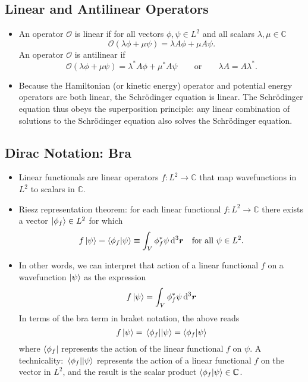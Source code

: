 \documentclass[11pt, a4paper]{article}
\newcommand{\diff}{\mathop{}\!\mathrm{d}} %
\newcommand{\dr}{\diff^{3} \r}  %
\newcommand{\eqtext}[1]{\qquad \text{#1} \qquad}
\newcommand{\Schro}{Schr\"{o}dinger\xspace}
\renewcommand{\vec}[1]{\bm{#1}} %
\renewcommand{\r}{\vec{r}}  %
\renewcommand{\O}{\mathcal{O}}  %
\newcommand{\p}{\psi}  %
\begin{document}
\subsection{Linear and Antilinear Operators}
\begin{itemize}
	\item An operator $ \O $ is linear if for all vectors $ \phi, \psi \in L^{2} $ and all scalars $ \lambda, \mu \in \mathbb{C} $
	\begin{equation*}
		\O(\lambda \phi + \mu \p)  = \lambda A \phi + \mu A \p.
	\end{equation*}
	An operator $ \O $ is antilinear if
	\begin{equation*}
		\O(\lambda \phi + \mu \p)  = \lambda^{*} A \phi + \mu^{*} A \p \eqtext{or} \lambda A = A \lambda^{*}.
	\end{equation*}
	
	\item Because the Hamiltonian (or kinetic energy) operator and potential energy operators are both linear, the \Schro equation is linear. The \Schro equation thus obeys the superposition principle: any linear combination of solutions to the \Schro equation also solves the \Schro equation.
\end{itemize}

\subsection{Dirac Notation: Bra}
\begin{itemize}
	\item Linear functionals are linear operators $ f:L^{2} \to \mathbb{C} $ that map wavefunctions in $ L^{2} $ to scalars in $ \mathbb{C} $. 
	
	\item Riesz representation theorem: for each linear functional $ f:L^{2} \to \mathbb{C} $ there exists a vector $ \ket{\phi_{f}} \in L^{2} $ for which 
	\begin{equation*}
		f\ket{\psi} = \braket{\phi_{f}}{\psi} \equiv \int_{V} \phi_{f}^{*} \psi \dr  \quad \text{for all } \psi \in L^{2}.
	\end{equation*}
	
	\item In other words, we can interpret that action of a linear functional $ f $ on a wavefunction $ \ket{\psi} $ as the expression
	\begin{equation*}
		f\ket{\psi} =  \int_{V} \phi_{f}^{*} \psi \dr
	\end{equation*}
	In terms of the bra term in braket notation, the above reads
	\begin{equation*}
		f \ket{\psi} = \mel{\phi_{f}}{}{\psi} = \braket{\phi_{f}}{\psi}
	\end{equation*}
	where $ \bra{\phi_{f}} $ represents the action of the linear functional $ f $ on $ \psi $. A technicality:  $ \mel{\phi_{f}}{}{\psi}  $ represents the action of a linear functional $ f $ on the vector in $ L^{2} $, and the result is the scalar product $ \braket{\phi_{f}}{\psi} \in \mathbb{C} $. 
	
\end{itemize}
\end{document}
